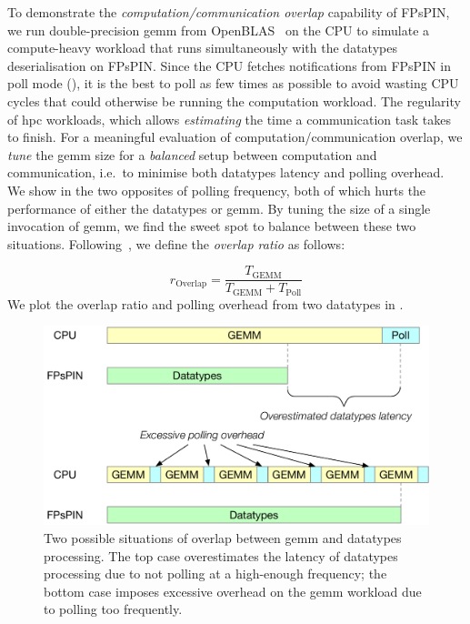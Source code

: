 To demonstrate the \emph{computation/communication overlap} capability of FPsPIN, we run double-precision \ac{gemm} from OpenBLAS~\cite{xianyi_model-driven_2012} on the CPU to simulate a compute-heavy workload that runs simultaneously with the datatypes deserialisation on FPsPIN.  Since the CPU fetches notifications from FPsPIN in poll mode (), it is the best to poll as few times as possible to avoid wasting CPU cycles that could otherwise be running the computation workload.  The regularity of \ac{hpc} workloads, which allows \emph{estimating} the time a communication task takes to finish.  For a meaningful evaluation of computation/communication overlap, we \emph{tune} the \ac{gemm} size for a \emph{balanced} setup between computation and communication, i.e.\ to minimise both datatypes latency and polling overhead.  We show in  the two opposites of polling frequency, both of which hurts the performance of either the datatypes or \ac{gemm}.  By tuning the size of a single invocation of \ac{gemm}, we find the sweet spot to balance between these two situations.  Following~\cite{hoefler_implementation_2007}, we define the \emph{overlap ratio} as follows:

\[
r_\text{Overlap} = \frac{T_{\text{GEMM}}}{T_{\text{GEMM}} + T_{\text{Poll}}}
\]
We plot the overlap ratio and polling overhead from two datatypes in .

\begin{figure}[tp]
    \centering
    \includegraphics[width=.8\textwidth]{thesis/figures/datatypes-tune-goal.pdf}
    \caption{Two possible situations of overlap between \ac{gemm} and datatypes processing.  The top case overestimates the latency of datatypes processing due to not polling at a high-enough frequency; the bottom case imposes excessive overhead on the \ac{gemm} workload due to polling too frequently.} \label{fig:datatypes-tuning-goal}
\end{figure}


